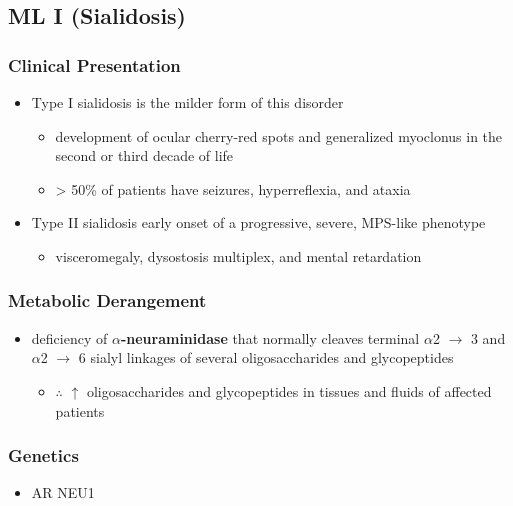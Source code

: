\documentclass[12pt]{scrartcl}
\begin{document}
\subsection{ML I (Sialidosis)}
\label{sec:org6e40a38}
\subsubsection{Clinical Presentation}
\label{sec:orge08fc4f}
\begin{itemize}
\item Type I sialidosis is the milder form of this disorder
\begin{itemize}
\item development of ocular cherry-red spots and generalized
myoclonus in the second or third decade of life
\item \textgreater{} 50\% of patients have seizures, hyperreflexia, and ataxia
\end{itemize}

\item Type II sialidosis early onset of a progressive, severe, MPS-like
phenotype
\begin{itemize}
\item visceromegaly, dysostosis multiplex, and mental retardation
\end{itemize}
\end{itemize}

\subsubsection{Metabolic Derangement}
\label{sec:org544ec0b}
\begin{itemize}
\item deficiency of \textbf{\(\alpha\)-neuraminidase} that normally cleaves terminal
\(\alpha\)2 \(\to\) 3 and \(\alpha\)2 \(\to\) 6 sialyl linkages of several
oligosaccharides and glycopeptides
\begin{itemize}
\item \(\therefore\) \(\uparrow\) oligosaccharides and glycopeptides in tissues
and fluids of affected patients
\end{itemize}
\end{itemize}

\subsubsection{Genetics}
\label{sec:org7195e07}
\begin{itemize}
\item AR NEU1
\end{itemize}
\end{document}
